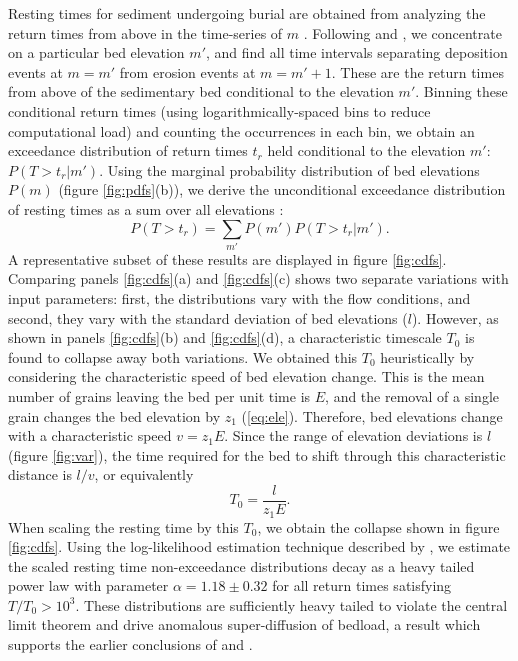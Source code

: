 \documentclass[draft]{agujournal2018}
\begin{document}
Resting times for sediment undergoing burial are obtained from analyzing the return times from above in the time-series of $m$ \citep[e.g.,][]{Redner2007}.
Following \citet{Voepel2013} and \citet{Martin2014}, we concentrate on a particular bed elevation $m'$, and find all time intervals separating deposition events at $m=m'$ from erosion events at $m=m'+1$.
These are the return times from above of the sedimentary bed conditional to the elevation $m'$.
Binning these conditional return times (using logarithmically-spaced bins to reduce computational load) and counting the occurrences in each bin, we obtain an exceedance distribution of return times $t_r$ held conditional to the elevation $m'$: $P(T>t_r|m')$.
Using the marginal probability distribution of bed elevations $P(m)$ (figure \ref{fig:pdfs}(b)), we derive the unconditional exceedance distribution of resting times as a sum over all elevations \citep{Yang1971, Nakagawa1980, Voepel2013, Martin2014}: 
\begin{equation} P(T>t_r) = \sum_{m'} P(m') P(T>t_r|m') .\end{equation}
A representative subset of these results are displayed in figure \ref{fig:cdfs}.
Comparing panels \ref{fig:cdfs}(a) and \ref{fig:cdfs}(c) shows two separate variations with input parameters: first, the distributions vary with the flow conditions, and second, they vary with the standard deviation of bed elevations ($l$).
However, as shown in panels \ref{fig:cdfs}(b) and \ref{fig:cdfs}(d), a characteristic timescale $T_0$ is found to collapse away both variations.
We obtained this $T_0$ heuristically by considering the characteristic speed of bed elevation change.
This is the mean number of grains leaving the bed per unit time is $E$, and the removal of a single grain changes the bed elevation by $z_1$ (\ref{eq:ele}). 
Therefore, bed elevations change with a characteristic speed $v = z_1 E$.
Since the range of elevation deviations is $l$ (figure \ref{fig:var}), the time required for the bed to shift through this characteristic distance is $l/v$, or equivalently
\begin{equation} T_0 = \frac{l}{z_1 E}.\label{eq:time}\end{equation}
When scaling the resting time by this $T_0$, we obtain the collapse shown in figure \ref{fig:cdfs}.
Using the log-likelihood estimation technique described by \citet{Newman2005}, we estimate the scaled resting time non-exceedance distributions decay as a heavy tailed power law with parameter $\alpha = 1.18 \pm 0.32$ for all return times satisfying $T/T_0 > 10^3$.
These distributions are sufficiently heavy tailed to violate the central limit theorem and drive anomalous super-diffusion of bedload, a result which supports the earlier conclusions of \citet{Voepel2013} and \citet{Martin2014}.
\end{document}
